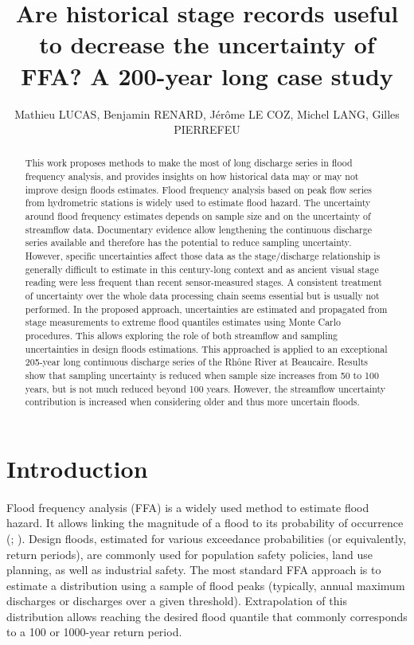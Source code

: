 \documentclass[11pt]{article}
\title{Are historical stage records useful to decrease the uncertainty of FFA? A 200-year long case study}
\author{Mathieu LUCAS, Benjamin RENARD, Jérôme LE COZ, Michel LANG, Gilles PIERREFEU}
\begin{document}
\maketitle

\begin{abstract}

    This work proposes methods to make the most of long discharge series in flood frequency analysis, and provides insights on how historical data may or may not improve design floods estimates. Flood frequency analysis based on peak flow series from hydrometric stations is widely used to estimate flood hazard. The uncertainty around flood frequency estimates depends on sample size and on the uncertainty of streamflow data. Documentary evidence allow lengthening the continuous discharge series available and therefore has the potential to reduce sampling uncertainty. However, specific uncertainties affect those data as the stage/discharge relationship is generally difficult to estimate in this century-long context and as ancient visual stage reading were less frequent than recent sensor-measured stages. A consistent treatment of uncertainty over the whole data processing chain seems essential but is usually not performed. In the proposed approach, uncertainties are estimated and propagated from stage measurements to extreme flood quantiles estimates using Monte Carlo procedures. This allows exploring the role of both streamflow and sampling uncertainties in design floods estimations. This approached is applied to an exceptional 205-year long continuous discharge series of the Rhône River at Beaucaire. Results show that sampling uncertainty is reduced when sample size increases from 50 to 100 years, but is not much reduced beyond 100 years. However, the streamflow uncertainty contribution is increased when considering older and thus more uncertain floods. 

\end{abstract}

\section{Introduction}
    \paragraph{}
    Flood frequency analysis (FFA) is a widely used method to estimate flood hazard. It allows linking the magnitude of a flood to its probability of occurrence (\citet{hamed_flood_2019}; \citet{jain_design_2019}). Design floods, estimated for various exceedance probabilities (or equivalently, return periods), are commonly used for population safety policies, land use planning, as well as industrial safety. The most standard FFA approach is to estimate a distribution using a sample of flood peaks (typically, annual maximum discharges or discharges over a given threshold). Extrapolation of this distribution allows reaching the desired flood quantile that commonly corresponds to a 100 or 1000-year return period. 
    
\end{document}
